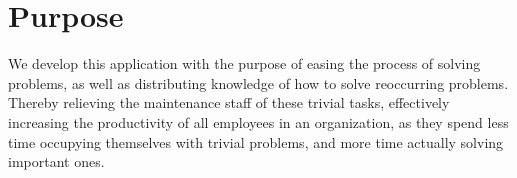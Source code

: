\section{Purpose}
We develop this application with the purpose of easing the process of solving problems, as well as distributing knowledge of how to solve reoccurring problems.
Thereby relieving the maintenance staff of these trivial tasks, effectively increasing the productivity of all employees in an organization, as they spend less time occupying themselves with trivial problems, and more time actually solving important ones.

